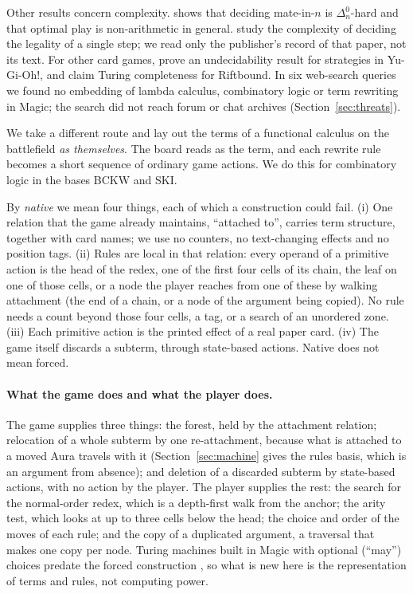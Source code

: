 \documentclass[11pt]{article}
\theoremstyle{definition}
\begin{document}
Other results concern complexity. \citet{biderman2020} shows that deciding mate-in-$n$ is
$\Delta^0_n$-hard and that optimal play is non-arithmetic in general.
\citet{chatterjee2016} study the complexity of deciding the legality of a single step; we
read only the publisher's record of that paper, not its text. For other card games, \citet{nicolosi2026} prove an undecidability result for
strategies in Yu-Gi-Oh!, and \citet{dalaklis2026} claim Turing completeness for Riftbound.
In six web-search queries we found no embedding of lambda calculus, combinatory logic or
term rewriting in Magic; the search did not reach forum or chat archives
(Section~\ref{sec:threats}).

We take a different route and lay out the terms of a functional calculus on the
battlefield \emph{as themselves}. The board reads as the term, and each rewrite rule
becomes a short sequence of ordinary game actions. We do this for combinatory logic in the
bases BCKW and SKI.

By \emph{native} we mean four things, each of which a construction could fail.
(i) One relation that the game already maintains, ``attached to'', carries term structure,
together with card names; we use no counters, no text-changing effects and no position
tags. (ii) Rules are local in that relation: every operand of a primitive action is the
head of the redex, one of the first four cells of its chain, the leaf on one of those
cells, or a node the player reaches from one of these by walking attachment (the end of a
chain, or a node of the argument being copied). No rule needs a count beyond those four
cells, a tag, or a search of an unordered zone. (iii) Each primitive action is the printed
effect of a real paper card. (iv) The game itself discards a subterm, through state-based
actions. Native does not mean forced.

\paragraph{What the game does and what the player does.} The game supplies three things:
the forest, held by the attachment relation; relocation of a whole subterm by one
re-attachment, because what is attached to a moved Aura travels with it
(Section~\ref{sec:machine} gives the rules basis, which is an argument from absence); and
deletion of a discarded subterm by state-based actions, with no action by the player. The
player supplies the rest: the search for the normal-order redex, which is a depth-first
walk from the anchor; the arity test, which looks at up to three cells below the head; the
choice and order of the moves of each rule; and the copy of a duplicated argument, a
traversal that makes one copy per node. Turing machines built in Magic with optional
(``may'') choices predate the forced construction \citep{churchillsite}, so what is new
here is the representation of terms and rules, not computing power.
\end{document}
